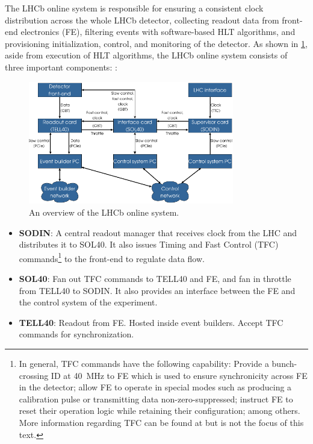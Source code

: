 The LHCb online system is responsible for ensuring a consistent clock
distribution across the whole LHCb detector,
collecting readout data from front-end electronics (FE),
filtering events with software-based HLT algorithms,
and provisioning initialization, control, and monitoring of the detector.
As shown in \cref{fig:lhcb-online},
aside from execution of HLT algorithms,
the LHCb online system consists of three important components:
\cite{Colombo_2018}:

\begin{figure}[!htb]
    \centering
    \includegraphics[width=0.8\textwidth]{./figs-ut-upgrade/online/lhcb_online_sys_overview.pdf}
    \caption{
        An overview of the LHCb online system.
    }
    \label{fig:lhcb-online}
\end{figure}

\begin{itemize}
    \item \textbf{SODIN}:
        A central readout manager that receives clock from the LHC and
        distributes it to SOL40.
        It also issues Timing and Fast Control (TFC) commands\footnote{
            In general, TFC commands have the following capability:
            Provide a bunch-crossing ID at 40~MHz to FE which is used to ensure
            synchronicity across FE in the detector;
            allow FE to operate in special modes such as producing a calibration
            pulse or transmitting data non-zero-suppressed;
            instruct FE to reset their operation logic while retaining their
            configuration;
            among others.
            More information regarding TFC can be found at
            \cite{Alessio:1424363} but is not the focus of this text.
        } to the front-end to regulate data flow.

    \item \textbf{SOL40}:
        Fan out TFC commands to TELL40 and FE,
        and fan in throttle from TELL40 to SODIN.
        It also provides an interface between the FE and the control system of
        the experiment.

    \item \textbf{TELL40}:
        Readout from FE. Hosted inside event builders.
        Accept TFC commands for synchronization.
\end{itemize}

